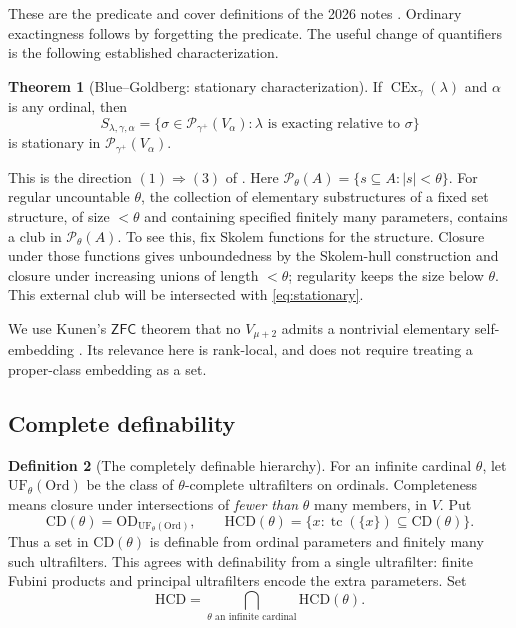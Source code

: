 \documentclass[11pt,letterpaper]{article}
\theoremstyle{definition}
\newtheorem{definition}{Definition}[section]
\newtheorem{theorem}[definition]{Theorem}
\newcommand{\ZFC}{\mathsf{ZFC}}
\newcommand{\OD}{\mathrm{OD}}
\newcommand{\CEx}{\operatorname{CEx}}
\newcommand{\Ord}{\mathrm{Ord}}
\newcommand{\CD}{\mathrm{CD}}
\newcommand{\HCD}{\mathrm{HCD}}
\newcommand{\UF}{\mathrm{UF}}
\newcommand{\Pow}{\mathcal{P}}
\newcommand{\tc}{\operatorname{tc}}
\begin{document}
These are the predicate and cover definitions of the 2026 notes \cite[Definitions 2.6, 3.1, and 3.2]{cover}. Ordinary exactingness follows by forgetting the predicate. The useful change of quantifiers is the following established characterization.

\begin{theorem}[Blue--Goldberg: stationary characterization]\label{input:stationary}
If $\CEx_\gamma(\lambda)$ and $\alpha$ is any ordinal, then
\begin{equation}\label{eq:stationary}
 S_{\lambda,\gamma,\alpha}
 =\{\sigma\in\Pow_{\gamma^+}(V_\alpha):
                   \lambda\text{ is exacting relative to }\sigma\}
\end{equation}
is stationary in $\Pow_{\gamma^+}(V_\alpha)$.
\end{theorem}

This is the direction $(1)\Rightarrow(3)$ of \cite[Proposition 3.4]{cover}. Here $\Pow_\theta(A)=\{s\subseteq A:|s|<\theta\}$. For regular uncountable $\theta$, the collection of elementary substructures of a fixed set structure, of size $<\theta$ and containing specified finitely many parameters, contains a club in $\Pow_\theta(A)$. To see this, fix Skolem functions for the structure. Closure under those functions gives unboundedness by the Skolem-hull construction and closure under increasing unions of length $<\theta$; regularity keeps the size below $\theta$. This external club will be intersected with \eqref{eq:stationary}.

We use Kunen's $\ZFC$ theorem that no $V_{\mu+2}$ admits a nontrivial elementary self-embedding \cite{kunen}. Its relevance here is rank-local, and does not require treating a proper-class embedding as a set.

\subsection{Complete definability}

\begin{definition}[The completely definable hierarchy]\label{def:hcd}
For an infinite cardinal $\theta$, let $\UF_\theta(\Ord)$ be the class of $\theta$-complete ultrafilters on ordinals. Completeness means closure under intersections of \emph{fewer than} $\theta$ many members, in $V$. Put
\[
 \CD(\theta)=\OD_{\UF_\theta(\Ord)},\qquad
 \HCD(\theta)=\{x:\tc(\{x\})\subseteq\CD(\theta)\}.
\]
Thus a set in $\CD(\theta)$ is definable from ordinal parameters and finitely many such ultrafilters. This agrees with definability from a single ultrafilter: finite Fubini products and principal ultrafilters encode the extra parameters. Set
\[
 \HCD=\bigcap_{\theta\text{ an infinite cardinal}}\HCD(\theta).
\]
\end{definition}
\end{document}
